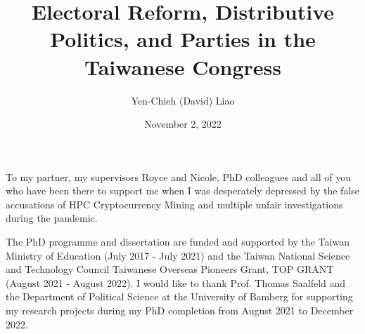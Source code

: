 \documentclass[12pt,leqno]{report}
\begin{document}
\sloppy
\title{Electoral Reform, Distributive Politics, 
            and Parties in the Taiwanese Congress} 
\author{Yen-Chieh (David) Liao}

\date{November 2, 2022}

\maketitle

\thispagestyle{plain}
\newenvironment{dedication}
{\cleardoublepage {}
  \begin{center} \em}
  {\end{center} \vspace*{\stretch{3}} }
\begin{dedication}

To my partner, my supervisors Royce and Nicole, PhD colleagues and all of you who have been there to support me when I was desperately depressed by the false accusations of HPC Cryptocurrency Mining and multiple unfair investigations during the pandemic.

\end{dedication}

\begin{acknowledgments}
The PhD programme and dissertation are funded and supported by the Taiwan Ministry of Education (July 2017 - July 2021) and the Taiwan National Science and Technology Council Taiwanese Overseas Pioneers Grant, TOP GRANT (August 2021 - August 2022). I would like to thank Prof. Thomas Saalfeld and the Department of Political Science at the University of Bamberg for supporting my research projects during my PhD completion from August 2021 to December 2022.
\end{acknowledgments}

\tableofcontents

\listoftables

\listoffigures

\begin{abstract}

\end{abstract}
\end{document}
